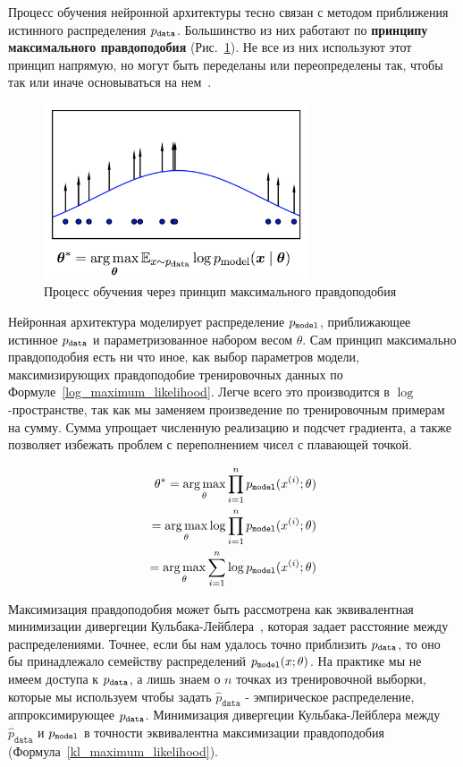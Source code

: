 \documentclass{spbau-diploma}
\begin{document}
Процесс обучения нейронной архитектуры тесно связан с методом приближения 
истинного распределения $p_{\texttt{data}}$. Большинство из них работают по 
\textbf{принципу максимального правдоподобия} (Рис.~\ref{mll_density}). Не 
все из них используют этот принцип напрямую, но могут быть переделаны или
переопределены так, чтобы так или иначе основываться на нем~\cite{1701.00160}.

\begin{figure}[H]
\centering
\includegraphics[width=0.7\textwidth]{images/mll_density.png}
\caption{Процесс обучения через принцип максимального правдоподобия~\cite{1701.00160}}
\label{mll_density}
\end{figure}

Нейронная архитектура моделирует распределение $p_{\texttt{model}}$, приближающее истинное
$p_{\texttt{data}}$ и параметризованное набором весом $\theta$. Сам принцип максимально 
правдоподобия есть ни что иное, как выбор параметров модели, максимизирующих
правдоподобие тренировочных данных по Формуле~\ref{log_maximum_likelihood}. 
Легче всего это производится в $\log$-пространстве, так как мы заменяем 
произведение по тренировочным примерам на сумму. Сумма
упрощает численную реализацию и подсчет градиента, а также 
позволяет избежать проблем с переполнением чисел с плавающей точкой. 

\begin{equation}
\label{log_maximum_likelihood}
\begin{split}
\theta^* = \operatorname*{arg\,max}_{\theta} \prod^{n}_{i=1}{p_{\texttt{model}}(x^{(i)}; \theta)} \\
= \operatorname*{arg\,max}_{\theta} \log \prod^{n}_{i=1}{p_{\texttt{model}}(x^{(i)}; \theta)} \\
= \operatorname*{arg\,max}_{\theta} \sum\limits^{n}_{i=1}{\log p_{\texttt{model}}(x^{(i)}; \theta)}
\end{split}
\end{equation}

Максимизация правдоподобия может быть рассмотрена как эквивалентная минимизации
дивергеции Кульбака-Лейблера~\cite{wiki:kldiv}, которая задает
расстояние между распределениями. Точнее, если бы нам удалось точно приблизить 
$p_{\texttt{data}}$, то оно бы принадлежало семейству распределений $p_{\texttt{model}}(x; \theta)$. 
На практике мы не имеем доступа к $p_{\texttt{data}}$, а лишь знаем о $n$ точках из 
тренировочной выборки, которые мы используем чтобы задать $\hat 
p_{\texttt{data}}$ - эмпирическое распределение, аппроксимирующее $p_{\texttt{data}}$. 
Минимизация дивергеции Кульбака-Лейблера между $\hat p_{\texttt{data}}$ и 
$p_{\texttt{model}}$ в точности эквивалентна максимизации правдоподобия
(Формула~\ref{kl_maximum_likelihood}).
\end{document}
